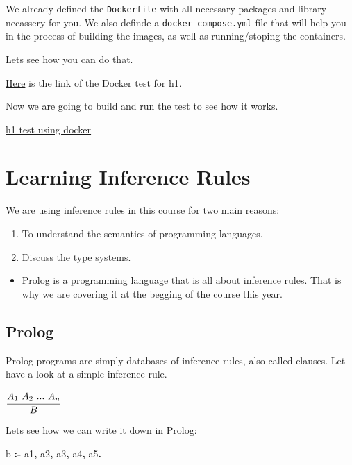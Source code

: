 \documentclass[11pt]{article}
\providecommand{\tightlist}{%
      \setlength{\itemsep}{0pt}\setlength{\parskip}{0pt}}
\newenvironment{Shaded}{}{}
\newcommand{\KeywordTok}[1]{\textcolor[rgb]{0.00,0.44,0.13}{\textbf{{#1}}}}
\newcommand{\NormalTok}[1]{{#1}}
\begin{document}
We already defined the \texttt{Dockerfile} with all necessary packages
and library necassery for you. We also definde a
\texttt{docker-compose.yml} file that will help you in the process of
building the images, as well as running/stoping the containers.

Lets see how you can do that.

\href{https://armkeh.github.io/principles-of-programming-languages/homework/h1.html\#Testing}{Here}
is the link of the Docker test for h1.

Now we are going to build and run the test to see how it works.

\href{https://github.com/armkeh/principles-of-programming-languages/tree/master/homework/testing/h1}{h1
test using docker}

    \hypertarget{learning-inference-rules}{%
\section{Learning Inference Rules}\label{learning-inference-rules}}

We are using inference rules in this course for two main reasons:

\begin{enumerate}
\def\labelenumi{\arabic{enumi}.}
\tightlist
\item
  To understand the semantics of programming languages.
\item
  Discuss the type systems.
\end{enumerate}

\begin{itemize}
\tightlist
\item
  Prolog is a programming language that is all about inference rules.
  That is why we are covering it at the begging of the course this year.
\end{itemize}

\hypertarget{prolog}{%
\subsection{Prolog}\label{prolog}}

Prolog programs are simply databases of inference rules, also called
clauses. Let have a look at a simple inference rule.

\(\cfrac{A_1\text{ }A_2\text{ }...\text{ }A_n}{B}\)

Lets see how we can write it down in Prolog:

    \begin{Shaded}
\begin{Highlighting}[]
\NormalTok{b }\KeywordTok{:{-}}\NormalTok{ a1}\KeywordTok{,}\NormalTok{ a2}\KeywordTok{,}\NormalTok{ a3}\KeywordTok{,}\NormalTok{ a4}\KeywordTok{,}\NormalTok{ a5}\KeywordTok{.}
\end{Highlighting}
\end{Shaded}
\end{document}
